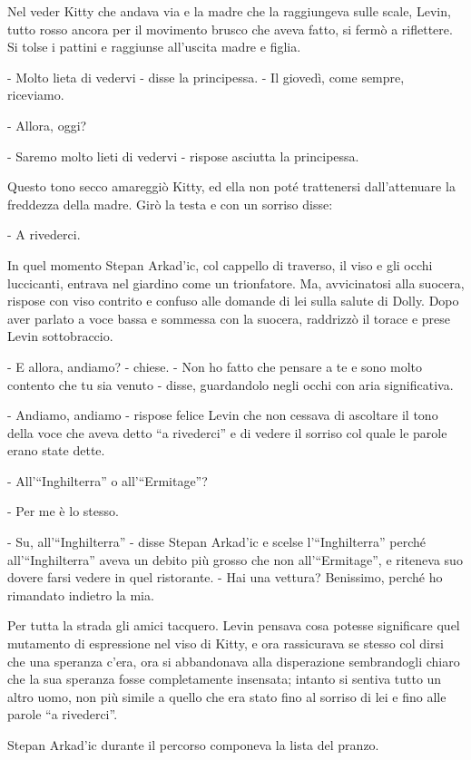 Nel veder Kitty che andava via e la madre che la raggiungeva sulle scale, Levin, tutto rosso ancora per il movimento brusco che aveva fatto, si fermò a riflettere. Si tolse i pattini e raggiunse all'uscita madre e figlia. 

- Molto lieta di vedervi - disse la principessa. - Il giovedì, come sempre, riceviamo. 

- Allora, oggi? 

- Saremo molto lieti di vedervi - rispose asciutta la principessa. 

Questo tono secco amareggiò Kitty, ed ella non poté trattenersi dall'attenuare la freddezza della madre. Girò la testa e con un sorriso disse: 

- A rivederci. 

In quel momento Stepan Arkad'ic, col cappello di traverso, il viso e gli occhi luccicanti, entrava nel giardino come un trionfatore. Ma, avvicinatosi alla suocera, rispose con viso contrito e confuso alle domande di lei sulla salute di Dolly. Dopo aver parlato a voce bassa e sommessa con la suocera, raddrizzò il torace e prese Levin sottobraccio. 

- E allora, andiamo? - chiese. - Non ho fatto che pensare a te e sono molto contento che tu sia venuto - disse, guardandolo negli occhi con aria significativa. 

- Andiamo, andiamo - rispose felice Levin che non cessava di ascoltare il tono della voce che aveva detto ``a rivederci'' e di vedere il sorriso col quale le parole erano state dette. 

- All'``Inghilterra'' o all'``Ermitage''? 

- Per me è lo stesso. 

- Su, all'``Inghilterra'' - disse Stepan Arkad'ic e scelse l'``Inghilterra'' perché all'``Inghilterra'' aveva un debito più grosso che non all'``Ermitage'', e riteneva suo dovere farsi vedere in quel ristorante. - Hai una vettura? Benissimo, perché ho rimandato indietro la mia. 

Per tutta la strada gli amici tacquero. Levin pensava cosa potesse significare quel mutamento di espressione nel viso di Kitty, e ora rassicurava se stesso col dirsi che una speranza c'era, ora si abbandonava alla disperazione sembrandogli chiaro che la sua speranza fosse completamente insensata; intanto si sentiva tutto un altro uomo, non più simile a quello che era stato fino al sorriso di lei e fino alle parole ``a rivederci''. 

Stepan Arkad'ic durante il percorso componeva la lista del pranzo. 

